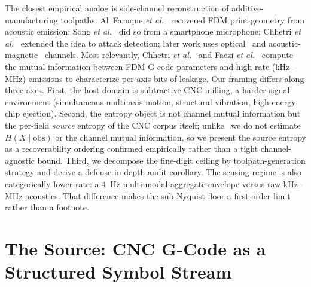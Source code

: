 \documentclass[entropy,article,submit,moreauthors,pdftex]{Definitions/mdpi}
\newcommand{\etal}{\textit{et al.}}
\begin{document}
The closest empirical analog is side-channel reconstruction of additive-manufacturing toolpaths. Al~Faruque \etal~\cite{alfaruque2016acoustic} recovered FDM print geometry from acoustic emission; Song \etal~\cite{song2016my} did so from a smartphone microphone; Chhetri \etal~\cite{chhetri2016kcad} extended the idea to attack detection; later work uses optical~\cite{chattopadhyay2025video} and acoustic-magnetic~\cite{jamarani2024screg} channels. Most relevantly, Chhetri \etal~\cite{chhetri2017confidentiality} and Faezi \etal~\cite{faezi2020oligosnoop} compute the mutual information between FDM G-code parameters and high-rate (kHz--MHz) emissions to characterize per-axis bits-of-leakage. Our framing differs along three axes. First, the host domain is subtractive CNC milling, a harder signal environment (simultaneous multi-axis motion, structural vibration, high-energy chip ejection). Second, the entropy object is not channel mutual information but the per-field \emph{source} entropy of the CNC corpus itself; unlike~\cite{chhetri2017confidentiality,faezi2020oligosnoop} we do not estimate $H(X\mid\text{obs})$ or the channel mutual information, so we present the source entropy as a recoverability ordering confirmed empirically rather than a tight channel-agnostic bound. Third, we decompose the fine-digit ceiling by toolpath-generation strategy and derive a defense-in-depth audit corollary. The sensing regime is also categorically lower-rate: a 4~Hz multi-modal aggregate envelope versus raw kHz--MHz acoustics. That difference makes the sub-Nyquist floor a first-order limit rather than a footnote.

\section{The Source: CNC G-Code as a Structured Symbol Stream}
\label{sec:source}
\end{document}
